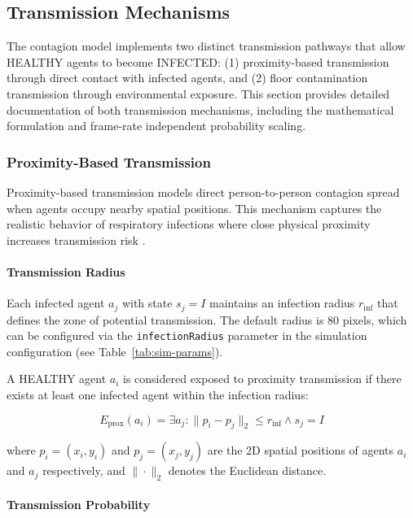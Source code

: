 \subsection{Transmission Mechanisms}
\label{sec:transmission}

The contagion model implements two distinct transmission pathways that allow HEALTHY agents to become INFECTED: (1) proximity-based transmission through direct contact with infected agents, and (2) floor contamination transmission through environmental exposure. This section provides detailed documentation of both transmission mechanisms, including the mathematical formulation and frame-rate independent probability scaling.

\subsubsection{Proximity-Based Transmission}

Proximity-based transmission models direct person-to-person contagion spread when agents occupy nearby spatial positions. This mechanism captures the realistic behavior of respiratory infections where close physical proximity increases transmission risk \cite{anderson1992infectious}.

\paragraph{Transmission Radius}

Each infected agent $a_j$ with state $s_j = I$ maintains an infection radius $r_{\text{inf}}$ that defines the zone of potential transmission. The default radius is 80 pixels, which can be configured via the \texttt{infectionRadius} parameter in the simulation configuration (see Table~\ref{tab:sim-params}).

A HEALTHY agent $a_i$ is considered exposed to proximity transmission if there exists at least one infected agent within the infection radius:

\begin{equation}
\label{eq:proximity-exposure}
E_{\text{prox}}(a_i) = \exists a_j : \|p_i - p_j\|_2 \leq r_{\text{inf}} \land s_j = I
\end{equation}

where $p_i = (x_i, y_i)$ and $p_j = (x_j, y_j)$ are the 2D spatial positions of agents $a_i$ and $a_j$ respectively, and $\|\cdot\|_2$ denotes the Euclidean distance.

\paragraph{Transmission Probability}

